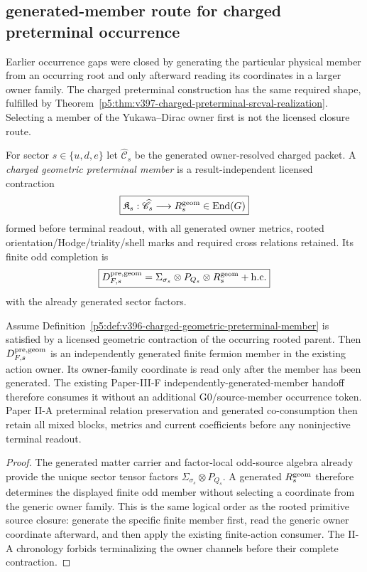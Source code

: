 \documentclass[12pt,a4paper]{article}
\begin{document}
\subsection*{generated-member route for charged preterminal occurrence}
\label{p5:sec:v396-generated-member-route}
Earlier occurrence gaps were closed by generating the particular physical
member from an occurring root and only afterward reading its coordinates in a
larger owner family.  The charged preterminal construction has the same required
shape, fulfilled by Theorem~\ref{p5:thm:v397-charged-preterminal-srcval-realization}.
Selecting a member of the Yukawa--Dirac owner first is not the licensed
closure route.

\begin{definition}
\label{p5:def:v396-charged-geometric-preterminal-member}
For sector $s\in\{u,d,e\}$ let $\widehat{\mathscr C}_s$ be the generated
owner-resolved charged packet.  A \emph{charged geometric preterminal member}
is a result-independent licensed contraction
\[
 \boxed{
 \mathfrak K_s:\widehat{\mathscr C}_s
 \longrightarrow R_s^{\rm geom}\in\operatorname{End}(G)}
\]
formed before terminal readout, with all generated owner metrics, rooted
orientation/Hodge/triality/shell marks and required cross relations retained.
Its finite odd completion is
\[
 \boxed{
 D_{F,s}^{\rm pre,geom}
 =\Sigma_{\sigma_s}\otimes P_{Q_s}\otimes R_s^{\rm geom}+\mathrm{h.c.}}
\]
with the already generated sector factors.
\end{definition}

\begin{theorem}
\label{p5:thm:v396-generated-member-occurrence-route}
Assume Definition~\ref{p5:def:v396-charged-geometric-preterminal-member} is
satisfied by a licensed geometric contraction of the occurring rooted parent.
Then $D_{F,s}^{\rm pre,geom}$ is an independently generated finite fermion
member in the existing action owner.  Its owner-family coordinate is read only
after the member has been generated.  The existing Paper-III-F
independently-generated-member handoff therefore consumes it without an
additional G0/source-member occurrence token.  Paper II-A preterminal relation
preservation and generated co-consumption then retain all mixed blocks,
metrics and current coefficients before any noninjective terminal readout.
\end{theorem}

\begin{proof}
The generated matter carrier and factor-local odd-source algebra already
provide the unique sector tensor factors $\Sigma_{\sigma_s}\otimes P_{Q_s}$.
A generated $R_s^{\rm geom}$ therefore determines the displayed finite odd
member without selecting a coordinate from the generic owner family.  This is
the same logical order as the rooted primitive source closure: generate the
specific finite member first, read the generic owner coordinate afterward,
and then apply the existing finite-action consumer.  The II-A chronology
forbids terminalizing the owner channels before their complete contraction.
\end{proof}
\end{document}
